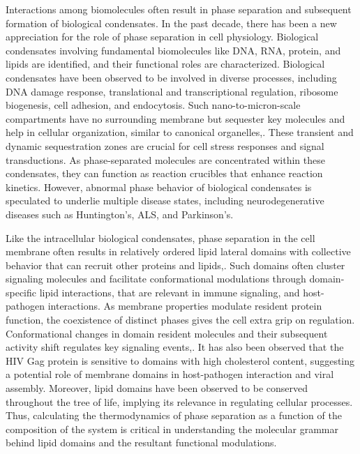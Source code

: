 \documentclass{biophys-new}
\begin{document}
Interactions among biomolecules often result in phase separation and subsequent formation of biological condensates\cite{Banani2016}.
In the past decade, there has been a new appreciation for the role of phase separation in cell physiology\cite{Banani2017}. Biological condensates involving fundamental biomolecules like DNA\cite{Larson2017}, RNA\cite{Langdon2018}, protein\cite{Li2012}, and lipids\cite{Sezgin2017} are identified, and their functional roles are characterized.
Biological condensates have been observed to be involved in diverse processes, including DNA damage response\cite{Altmeyer2015}, translational\cite{Decker2012} and transcriptional\cite{Lallemand-Breitenbach2010} regulation, ribosome biogenesis\cite{Feric2016}, cell adhesion\cite{Case2015}, and endocytosis\cite{Degreif2019}.
Such nano-to-micron-scale compartments have no surrounding membrane but sequester key molecules and help in cellular organization, similar to canonical organelles\cite{Mao2011},\cite{Boisvert2007}.
These transient and dynamic sequestration zones are crucial for cell stress responses\cite{Boisvert2007} and signal transductions\cite{Janosi2012}.
As phase-separated molecules are concentrated within these condensates, they can function as reaction crucibles that enhance reaction kinetics\cite{Strulson2012}.
However, abnormal phase behavior of biological condensates is speculated to underlie multiple disease states, including neurodegenerative diseases such as Huntington's\cite{Li2016}, ALS\cite{Jain2017}, and Parkinson's\cite{Ray2020}.


Like the intracellular biological condensates, phase separation in the cell membrane often results in relatively ordered lipid lateral domains with collective behavior that can recruit other proteins and lipids\cite{Sezgin2017},\cite{Case2019}.
Such domains often cluster signaling molecules\cite{Tian2007} and facilitate conformational modulations through domain-specific lipid interactions\cite{Laganowsky2014},\cite{Lingwood2011} that are relevant in immune signaling\cite{Beck-garcia2015},\cite{Wisser2017} and host-pathogen interactions\cite{Dick2012}.
As membrane properties modulate resident protein function, the coexistence of distinct phases gives the cell extra grip on regulation.
Conformational changes in domain resident molecules and their subsequent activity shift regulates key signaling events\cite{Laganowsky2014},\cite{Lingwood2011}.
It has also been observed that the HIV Gag protein is sensitive to domains with high cholesterol content, suggesting a potential role of membrane domains in host-pathogen interaction and viral assembly\cite{Dick2012}.
Moreover, lipid domains have been observed to be conserved throughout the tree of life, implying its relevance in regulating cellular processes\cite{Sezgin2017}. 
Thus, calculating the thermodynamics of phase separation as a function of the composition of the system is critical in understanding the molecular grammar behind lipid domains and the resultant functional modulations. 
\end{document}
